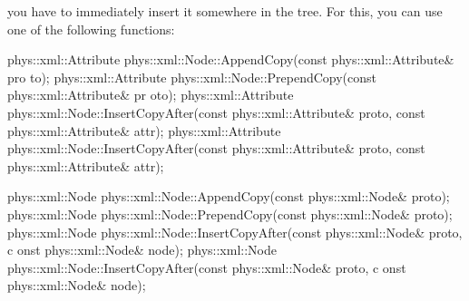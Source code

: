 \begin{DoxyItemize}
\item you have to immediately insert it somewhere in the tree. For this, you can use one of the following functions: 
\begin{DoxyCode}
 phys::xml::Attribute phys::xml::Node::AppendCopy(const phys::xml::Attribute& pro
      to);
 phys::xml::Attribute phys::xml::Node::PrependCopy(const phys::xml::Attribute& pr
      oto);
 phys::xml::Attribute phys::xml::Node::InsertCopyAfter(const 
      phys::xml::Attribute& proto, const phys::xml::Attribute& attr);
 phys::xml::Attribute phys::xml::Node::InsertCopyAfter(const 
      phys::xml::Attribute& proto, const phys::xml::Attribute& attr);

 phys::xml::Node phys::xml::Node::AppendCopy(const phys::xml::Node& proto);
 phys::xml::Node phys::xml::Node::PrependCopy(const phys::xml::Node& proto);
 phys::xml::Node phys::xml::Node::InsertCopyAfter(const phys::xml::Node& proto, c
      onst phys::xml::Node& node);
 phys::xml::Node phys::xml::Node::InsertCopyAfter(const phys::xml::Node& proto, c
      onst phys::xml::Node& node);
\end{DoxyCode}

\end{DoxyItemize}

